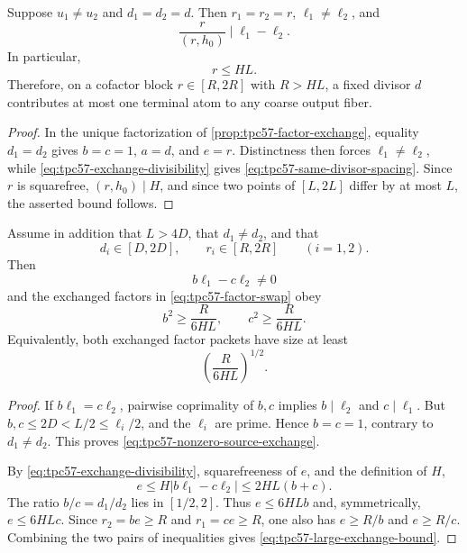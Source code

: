 \begin{corollary}
\label{cor:tpc57-same-divisor-short}
Suppose \(u_1\ne u_2\) and \(d_1=d_2=d\).  Then \(r_1=r_2=r\),
\(\ell_1\ne\ell_2\), and
\begin{equation}
 \frac r{(r,h_0)}\mid \ell_1-\ell_2.
 \label{eq:tpc57-same-divisor-spacing}
\end{equation}
In particular,
\begin{equation}
 \boxed{r\le HL.}
 \label{eq:tpc57-same-divisor-bound}
\end{equation}
Therefore, on a cofactor block \(r\in[R,2R]\) with \(R>HL\), a fixed
divisor \(d\) contributes at most one terminal atom to any coarse output
fiber.
\end{corollary}

\begin{proof}
In the unique factorization of
\cref{prop:tpc57-factor-exchange}, equality \(d_1=d_2\) gives
\(b=c=1\), \(a=d\), and \(e=r\).  Distinctness then forces
\(\ell_1\ne\ell_2\), while
\eqref{eq:tpc57-exchange-divisibility} gives
\eqref{eq:tpc57-same-divisor-spacing}.  Since \(r\) is squarefree,
\((r,h_0)\mid H\), and since two points of \([L,2L]\) differ by at most
\(L\), the asserted bound follows.
\end{proof}

\begin{proposition}
\label{prop:tpc57-large-exchange}
Assume in addition that \(L>4D\), that \(d_1\ne d_2\), and that
\begin{equation}
 d_i\in[D,2D],\qquad r_i\in[R,2R]\qquad(i=1,2).
 \label{eq:tpc57-common-dyadic-block}
\end{equation}
Then
\begin{equation}
 b\ell_1-c\ell_2\ne0
 \label{eq:tpc57-nonzero-source-exchange}
\end{equation}
and the exchanged factors in
\eqref{eq:tpc57-factor-swap} obey
\begin{equation}
 \boxed{
 b^2\ge\frac{R}{6HL},
 \qquad
 c^2\ge\frac{R}{6HL}.}
 \label{eq:tpc57-large-exchange-bound}
\end{equation}
Equivalently, both exchanged factor packets have size at least
\[
 \left(\frac{R}{6HL}\right)^{1/2}.
\]
\end{proposition}

\begin{proof}
If \(b\ell_1=c\ell_2\), pairwise coprimality of \(b,c\) implies
\(b\mid\ell_2\) and \(c\mid\ell_1\).  But
\(b,c\le2D<L/2\le\ell_i/2\), and the \(\ell_i\) are prime.  Hence
\(b=c=1\), contrary to \(d_1\ne d_2\).  This proves
\eqref{eq:tpc57-nonzero-source-exchange}.

By \eqref{eq:tpc57-exchange-divisibility}, squarefreeness of \(e\), and
the definition of \(H\),
\[
 e\le H|b\ell_1-c\ell_2|
 \le2HL(b+c).
\]
The ratio \(b/c=d_1/d_2\) lies in \([1/2,2]\).  Thus
\(e\le6HLb\) and, symmetrically, \(e\le6HLc\).  Since
\(r_2=be\ge R\) and \(r_1=ce\ge R\), one also has
\(e\ge R/b\) and \(e\ge R/c\).  Combining the two pairs of inequalities
gives \eqref{eq:tpc57-large-exchange-bound}.
\end{proof}

